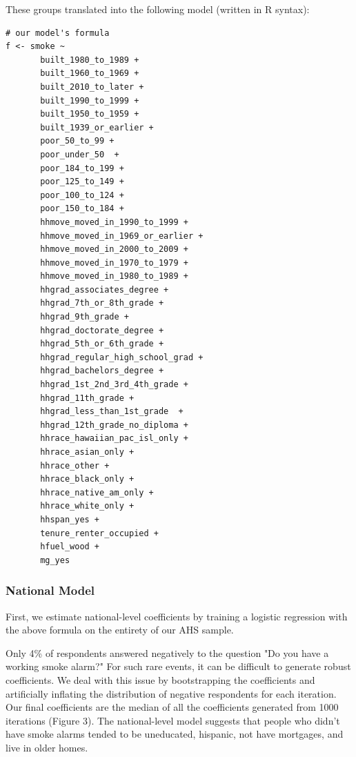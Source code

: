 \documentclass{sig-alternate}
\begin{document}
These groups translated into the following model (written in R syntax):

\begin{verbatim}
# our model's formula
f <- smoke ~  
       built_1980_to_1989 +
       built_1960_to_1969 +
       built_2010_to_later +
       built_1990_to_1999 +
       built_1950_to_1959 +
       built_1939_or_earlier +
       poor_50_to_99 +
       poor_under_50  +
       poor_184_to_199 +
       poor_125_to_149 +
       poor_100_to_124 +
       poor_150_to_184 +
       hhmove_moved_in_1990_to_1999 +
       hhmove_moved_in_1969_or_earlier +
       hhmove_moved_in_2000_to_2009 +
       hhmove_moved_in_1970_to_1979 +
       hhmove_moved_in_1980_to_1989 +
       hhgrad_associates_degree +
       hhgrad_7th_or_8th_grade +
       hhgrad_9th_grade +
       hhgrad_doctorate_degree +
       hhgrad_5th_or_6th_grade +
       hhgrad_regular_high_school_grad +
       hhgrad_bachelors_degree +
       hhgrad_1st_2nd_3rd_4th_grade +
       hhgrad_11th_grade +
       hhgrad_less_than_1st_grade  +
       hhgrad_12th_grade_no_diploma +
       hhrace_hawaiian_pac_isl_only +
       hhrace_asian_only +
       hhrace_other +
       hhrace_black_only +
       hhrace_native_am_only +
       hhrace_white_only +
       hhspan_yes +
       tenure_renter_occupied +
       hfuel_wood +
       mg_yes
\end{verbatim}

\subsubsection{National Model}

First, we estimate national-level coefficients by training a logistic regression with the above formula on the entirety of our AHS sample.

Only 4\% of respondents answered negatively to the question "Do you have a working smoke alarm?" For such rare events, it can be difficult to generate robust coefficients. We deal with this issue by bootstrapping the coefficients and artificially inflating the distribution of negative respondents for each iteration. Our final coefficients are the median of all the coefficients generated from 1000 iterations (Figure 3). The national-level model suggests that  people who didn't have smoke alarms tended to be uneducated, hispanic, not have mortgages, and live in older homes.
\end{document}
